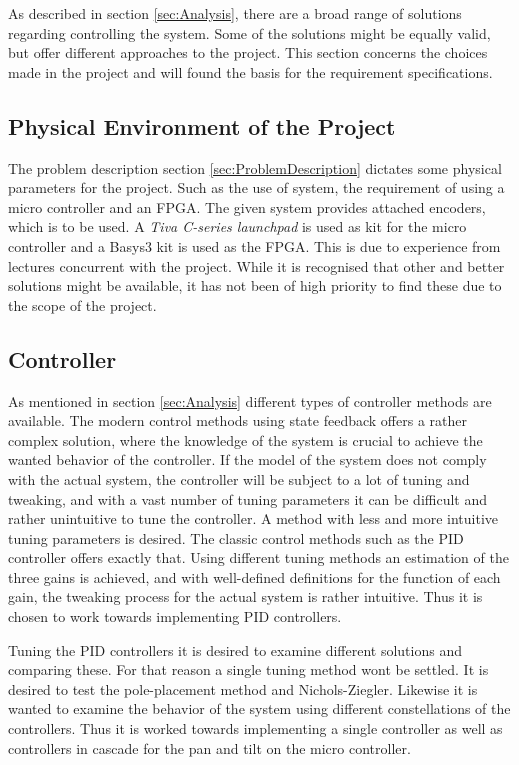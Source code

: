 \documentclass[../../main.tex]{subfiles}
\begin{document}
As described in section \ref{sec:Analysis}, there are a broad range of solutions regarding controlling the system. Some of the solutions might be equally valid, but offer different approaches to the project. This section concerns the choices made in the project and will found the basis for the requirement specifications.

\subsection*{Physical Environment of the Project}
The problem description section \ref{sec:ProblemDescription} dictates some physical parameters for the project. Such as the use of system, the requirement of using a micro controller and an FPGA. The given system provides attached encoders, which is to be used. A \textit{Tiva C-series launchpad} is used as kit for the micro controller and a Basys3 kit is used as the FPGA. This is due to experience from lectures concurrent with the project. While it is recognised that other and better solutions might be available, it has not been of high priority to find these due to the scope of the project. 

\subsection*{Controller}
As mentioned in section \ref{sec:Analysis} different types of controller methods are available. The modern control methods using state feedback offers a rather complex solution, where the knowledge of the system is crucial to achieve the wanted behavior of the controller. If the model of the system does not comply with the actual system, the controller will be subject to a lot of tuning and tweaking, and with a vast number of tuning parameters it can be difficult and rather unintuitive to tune the controller. A method with less and more intuitive tuning parameters is desired. The classic control methods such as the PID controller offers exactly that. Using different tuning methods an estimation of the three gains is achieved, and with well-defined definitions for the function of each gain, the tweaking process for the actual system is rather intuitive. Thus it is chosen to work towards implementing PID controllers.

Tuning the PID controllers it is desired to examine different solutions and comparing these. For that reason a single tuning method wont be settled. It is desired to test the pole-placement method and Nichols-Ziegler. Likewise it is wanted to examine the behavior of the system using different constellations of the controllers. Thus it is worked towards implementing a single controller  as well as controllers in cascade for the pan and tilt on the micro controller.
\end{document}
